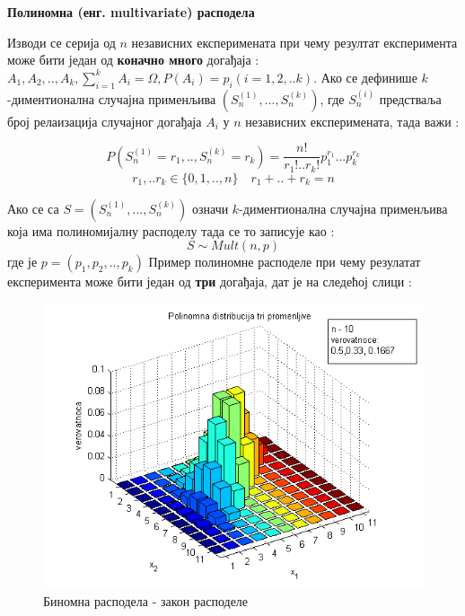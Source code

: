 \textbf{Полиномна (енг. multivariate) расподела}

Изводи се серија од $n$ независних експеримената при чему резултат експеримента може бити један од \textbf{коначно много} догађаја : $ A_1,A_2,..,A_k, \sum_{i=1}^k A_i = \Omega, P(A_i)=p_i (i=1,2,..k)$. 
Ако се дефинише $k$-диментионална случајна применљива $(S_n^{(1)},...,S_n^{(k)})$, где $S_n^{(i)}$ предстваља број релаизација случајног догађаја $A_i$ у  $n$ независних експеримената, тада важи :

$$
P(S_n^{(1)}=r_1,..,S_n^{(k)}=r_k) = \frac{n!}{r_1!..r_k!}p_1^{r_1}...p_k^{r_k} $$
$$
r_1,..r_k \in \lbrace 0,1,..,n \rbrace \quad
r_1+..+r_k = n
$$

Ако се са $S = (S_n^{(1)},...,S_n^{(k)})$ означи $k$-диментионална случајна применљива која има полиномијалну расподелу тада се то записује као :
$$
S \sim Mult(n,p)
$$
где је $p = (p_1,p_2,..,p_k)$
Пример полиномне расподеле при чему резулатат експеримента може бити један од \textbf{три} догађаја, дат је на следећој слици :


\begin{figure}[H]
    \centering
\captionsetup{justification=centering}
   \includegraphics[scale=0.8]{./Slike/slika29.png} 
	\caption{Биномна расподела - закон расподеле} 
	\label{fig:slika20}
\end{figure}




